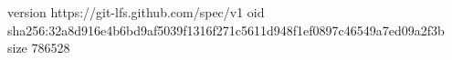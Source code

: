 version https://git-lfs.github.com/spec/v1
oid sha256:32a8d916e4b6bd9af5039f1316f271c5611d948f1ef0897c46549a7ed09a2f3b
size 786528
